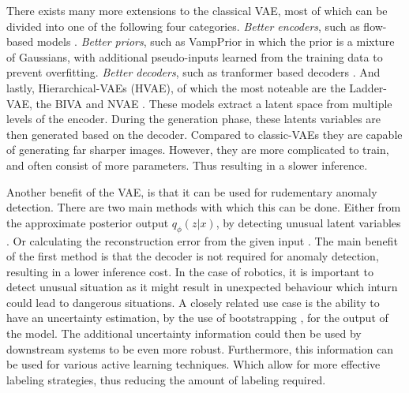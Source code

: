 There exists many more extensions to the classical VAE, most of which can be divided into one of the following four categories. \emph{Better encoders}, such as flow-based models \cite{Berg2018SylvesterNF,tomczak2017improving,rezende2015variational}. \emph{Better priors}, such as VampPrior \cite{tomczak2018vae} in which the prior is a mixture of Gaussians, with additional pseudo-inputs learned from the training data to prevent overfitting. \emph{Better decoders}, such as tranformer based decoders \cite{Henderson2022AVA,9054554}. And lastly, Hierarchical-VAEs (HVAE), of which the most noteable are the Ladder-VAE\cite{NIPS2016_6ae07dcb}, the BIVA \cite{maaloe2019biva} and NVAE \cite{vahdat2020nvae}. These models extract a latent space from multiple levels of the encoder. During the generation phase, these latents variables are then generated based on the decoder. Compared to classic-VAEs they are capable of generating far sharper images. However, they are more complicated to train, and often consist of more parameters. Thus resulting in a slower inference.

Another benefit of the VAE, is that it can be used for rudementary anomaly detection. There are two main methods with which this can be done. Either from the approximate posterior output $q_{\phi}(z|x)$, by detecting unusual latent variables \cite{marimont2020anomalydetectionlatentspace,angiulli2020improving,angiulli2023latent}. Or calculating the reconstruction error from the given input \cite{an2015variational, zhou2020unsupervisedanomalylocalizationusing, gouda2022unsupervised}. The main benefit of the first method is that the decoder is not required for anomaly detection, resulting in a lower inference cost. In the case of robotics, it is important to detect unusual situation as it might result in unexpected behaviour which inturn could lead to dangerous situations.
A closely related use case is the ability to have an uncertainty estimation, by the use of bootstrapping \cite{chen2018use,kohl2018probabilistic}, for the output of the model. The additional uncertainty information could then be used by downstream systems to be even more robust. Furthermore, this information can be used for various active learning \cite{hino2020active} techniques. Which allow for more effective labeling strategies, thus reducing the amount of labeling required.


